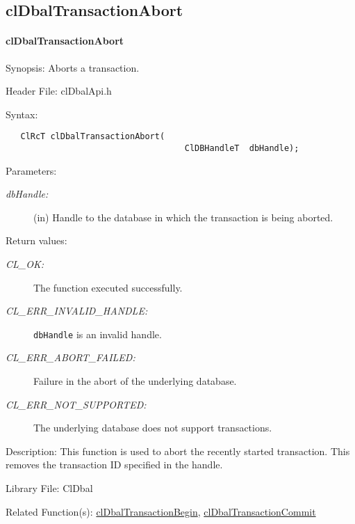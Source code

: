 \begin{flushleft}
\subsection{clDbalTransactionAbort}
\hypertarget{pagedbal113}{}\paragraph{cl\-Dbal\-Transaction\-Abort}\label{pagedbal113}
\begin{Desc}
\item[Synopsis:]Aborts a transaction.\end{Desc}
\begin{Desc}
\item[Header File:]clDbalApi.h\end{Desc}
\begin{Desc}
\item[Syntax:]

\footnotesize\begin{verbatim}   ClRcT clDbalTransactionAbort(
                              		ClDBHandleT  dbHandle);
\end{verbatim}
\normalsize
\end{Desc}
\begin{Desc}
\item[Parameters:]
\begin{description}
\item[{\em db\-Handle:}](in) Handle to the database in which the transaction is being aborted.\end{description}
\end{Desc}
\begin{Desc}
\item[Return values:]
\begin{description}
\item[{\em CL\_\-OK:}]The function executed successfully. 
\item[{\em CL\_\-ERR\_\-INVALID\_\-HANDLE:}]{\tt{dbHandle}} is an invalid handle. 
\item[{\em CL\_\-ERR\_\-ABORT\_\-FAILED:}]Failure in the abort of the underlying database.
\item[{\em CL\_\-ERR\_\-NOT\_\-SUPPORTED:}]The underlying database does not support transactions.\end{description}
\end{Desc}
\begin{Desc}
\item[Description:]This function is used to abort the recently started transaction. This removes the transaction ID specified in the handle.\end{Desc}
\begin{Desc}
\item[Library File:]Cl\-Dbal\end{Desc}
\begin{Desc}
\item[Related Function(s):]\hyperlink{pagedbal111}{cl\-Dbal\-Transaction\-Begin}, \hyperlink{pagedbal112}{cl\-Dbal\-Transaction\-Commit} \end{Desc}



\end{flushleft}
